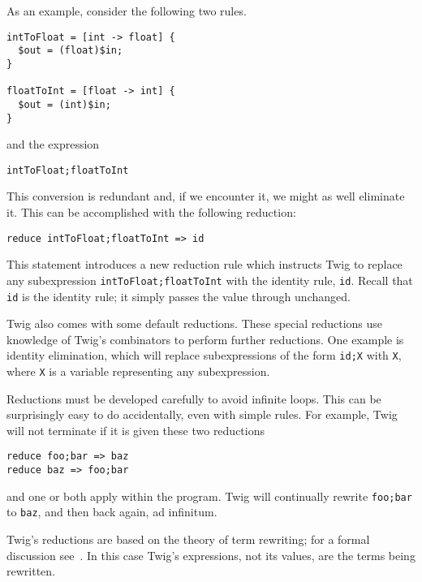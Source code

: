 As an example, consider the following two rules.

\begin{verbatim}
intToFloat = [int -> float] {
  $out = (float)$in;
}

floatToInt = [float -> int] {
  $out = (int)$in;
}
\end{verbatim}

and the expression

\begin{verbatim}
intToFloat;floatToInt
\end{verbatim}

This conversion is redundant and, if we encounter it, we might as well
eliminate it. This can be accomplished with the following reduction:

\begin{verbatim}
reduce intToFloat;floatToInt => id
\end{verbatim}

This statement introduces a new reduction rule which instructs Twig to replace
any subexpression \texttt{intToFloat;floatToInt} with the identity rule,
\texttt{id}. Recall that \texttt{id} is the identity rule; it simply passes
the value through unchanged.

Twig also comes with some default reductions. These special reductions use
knowledge of Twig's combinators to perform further reductions. One example is
identity elimination, which will replace subexpressions of the form
\texttt{id;X} with \texttt{X}, where \texttt{X} is a variable representing any
subexpression.

Reductions must be developed carefully to avoid infinite loops. This can be
surprisingly easy to do accidentally, even with simple rules. For example, Twig
will not terminate if it is given these two reductions

\begin{verbatim}
reduce foo;bar => baz
reduce baz => foo;bar
\end{verbatim}

and one or both apply within the program. Twig will continually rewrite
\texttt{foo;bar} to \texttt{baz}, and then back again, ad infinitum.

Twig's reductions are based on the theory of term rewriting; for a formal
discussion see~\cite{baader98rewriting}. In this case Twig's expressions, not
its values, are the terms being rewritten.
